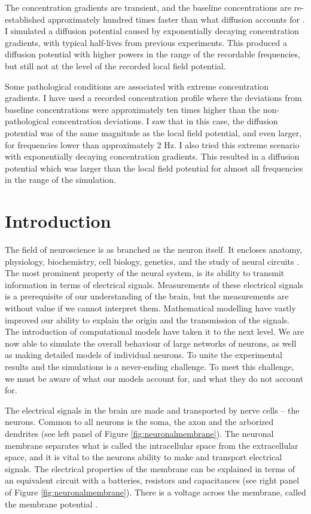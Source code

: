 \documentclass{uiophd}
\begin{document}
The concentration gradients are transient, and the baseline concentrations are re-established approximately hundred times faster than what diffusion accounts for \cite{CordingleySomjen}. I simulated a diffusion potential caused by exponentially decaying concentration gradients, with typical half-lives from previous experiments. This produced a diffusion potential with higher powers in the range of the recordable frequencies, but still not at the level of the recorded local field potential. 

Some pathological conditions are associated with extreme concentration gradients. I have used a recorded concentration profile where the deviations from baseline concentrations were approximately ten times higher than the non-pathological concentration deviations. I saw that in this case, the diffusion potential was of the same magnitude as the local field potential, and even larger, for frequencies lower than approximately 2 Hz. I also tried this extreme scenario with exponentially decaying concentration gradients. This resulted in a diffusion potential which was larger than the local field potential for almost all frequencies in the range of the simulation. 

\tableofcontents
\mainmatter

\chapter{Introduction}\label{Introduction}

The field of neuroscience is as branched as the neuron itself. It encloses anatomy, physiology, biochemistry, cell biology, genetics, and the study of neural circuits \cite{Neuroscience}. The most prominent property of the neural system, is its ability to transmit information in terms of electrical signals. Measurements of these electrical signals is a prerequisite of our understanding of the brain, but the measurements are without value if we cannot interpret them. Mathematical modelling have vastly improved our ability to explain the origin and the transmission of the signals. The introduction of computational models have taken it to the next level. We are now able to simulate the overall behaviour of large networks of neurons, as well as making detailed models of individual neurons. To unite the experimental results and the simulations is a never-ending challenge. To meet this challenge, we must be aware of what our models account for, and what they do not account for. 

The electrical signals in the brain are made and transported by nerve cells -- the neurons. Common to all neurons is the soma, the axon and the arborized dendrites (see left panel of Figure \ref{fig:neuronalmembrane}). The neuronal membrane separates what is called the intracellular space from the extracellular space, and it is vital to the neurons ability to make and transport electrical signals. The electrical properties of the membrane can be explained in terms of an equivalent circuit with a batteries, resistors and capacitances (see right panel of Figure \ref{fig:neuronalmembrane}). There is a voltage across the membrane, called the membrane potential . 
\end{document}

